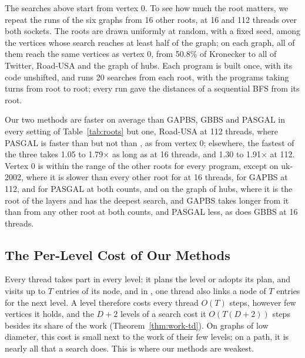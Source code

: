 The searches above start from vertex 0. To see how much the root matters, we repeat the runs of the six graphs from 16 other roots, at 16 and 112 threads over both sockets. The roots are drawn uniformly at random, with a fixed seed, among the vertices whose search reaches at least half of the graph; on each graph, all of them reach the same vertices as vertex 0, from 50.8\% of Kronecker to all of Twitter, Road-USA and the graph of hubs. Each program is built once, with its code unshifted, and runs 20 searches from each root, with the programs taking turns from root to root; every run gave the distances of a sequential BFS from its root.

Our two methods are faster on average than GAPBS, GBBS and PASGAL in every setting of Table~\ref{tab:roots} but one, Road-USA at 112 threads, where PASGAL is faster than \wfdo but not than \wfdomem, as from vertex 0; elsewhere, the fastest of the three takes 1.05 to 1.79$\times$ as long as \wfdo at 16 threads, and 1.30 to 1.91$\times$ at 112. Vertex 0 is within the range of the other roots for every program, except on uk-2002, where it is slower than every other root for \wfdo at 16 threads, for GAPBS at 112, and for PASGAL at both counts, and on the graph of hubs, where it is the root of the layers and has the deepest search, and GAPBS takes longer from it than from any other root at both counts, and PASGAL less, as does GBBS at 16 threads.

\subsection{The Per-Level Cost of Our Methods}
\label{sec:exp-deep}

Every thread takes part in every level: it plans the level or adopts its plan, and visits up to $T$ entries of its node, and in \wfdo, one thread also links a node of $T$ entries for the next level. A level therefore costs every thread $O(T)$ steps, however few vertices it holds, and the $D+2$ levels of a search cost it $O(T(D+2))$ steps besides its share of the work (Theorem~\ref{thm:work-td}). On graphs of low diameter, this cost is small next to the work of their few levels; on a path, it is nearly all that a search does. This is where our methods are weakest.

